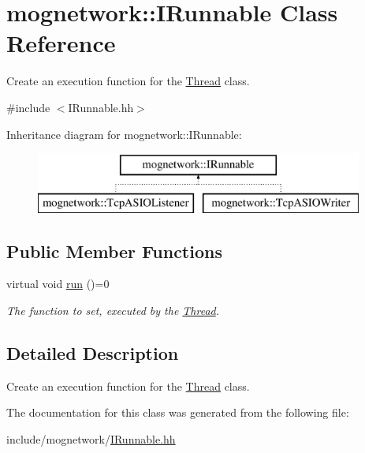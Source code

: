 \hypertarget{classmognetwork_1_1_i_runnable}{\section{mognetwork\-:\-:I\-Runnable Class Reference}
\label{classmognetwork_1_1_i_runnable}
}


Create an execution function for the \hyperlink{classmognetwork_1_1_thread}{Thread} class.  




{\ttfamily \#include $<$I\-Runnable.\-hh$>$}

Inheritance diagram for mognetwork\-:\-:I\-Runnable\-:\begin{figure}[H]
\begin{center}
\leavevmode
\includegraphics[height=2.000000cm]{classmognetwork_1_1_i_runnable}
\end{center}
\end{figure}
\subsection*{Public Member Functions}
\begin{DoxyCompactItemize}
\item 
\hypertarget{classmognetwork_1_1_i_runnable_ac53515c8ecf2b2c79cb9c161fdd600d1}{virtual void \hyperlink{classmognetwork_1_1_i_runnable_ac53515c8ecf2b2c79cb9c161fdd600d1}{run} ()=0}\label{classmognetwork_1_1_i_runnable_ac53515c8ecf2b2c79cb9c161fdd600d1}

\begin{DoxyCompactList}\small\item\em The function to set, executed by the \hyperlink{classmognetwork_1_1_thread}{Thread}. \end{DoxyCompactList}\end{DoxyCompactItemize}


\subsection{Detailed Description}
Create an execution function for the \hyperlink{classmognetwork_1_1_thread}{Thread} class. 

The documentation for this class was generated from the following file\-:\begin{DoxyCompactItemize}
\item 
include/mognetwork/\hyperlink{_i_runnable_8hh}{I\-Runnable.\-hh}\end{DoxyCompactItemize}
